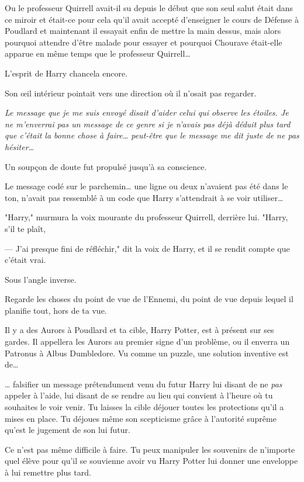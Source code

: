 Ou le professeur Quirrell avait-il su depuis le début que son seul salut était dans ce miroir et était-ce pour cela qu'il avait accepté d'enseigner le cours de Défense à Poudlard et maintenant il essayait enfin de mettre la main dessus, mais alors pourquoi attendre d'être malade pour essayer et pourquoi Chourave était-elle apparue en même temps que le professeur Quirrell…

L'esprit de Harry chancela encore.

Son œil intérieur pointait vers une direction où il n'osait pas regarder.

\emph{Le message que je me suis envoyé disait d'aider celui qui observe les étoiles. Je ne m'enverrai pas un message de ce genre si je n'avais pas déjà déduit plus tard que c'était la bonne chose à faire… peut-être que le message me dit juste de ne pas hésiter…}

Un soupçon de doute fut propulsé jusqu'à sa conscience.

Le message codé sur le parchemin… une ligne ou deux n'avaient pas été dans le ton, n'avait pas ressemblé à un code que Harry s'attendrait à se voir utiliser…

"Harry," murmura la voix mourante du professeur Quirrell, derrière lui. "Harry, s'il te plaît,

--- J'ai presque fini de réfléchir," dit la voix de Harry, et il se rendit compte que c'était vrai.

Sous l'angle inverse.

Regarde les choses du point de vue de l'Ennemi, du point de vue depuis lequel il planifie tout, hors de ta vue.

Il y a des Aurors à Poudlard et ta cible, Harry Potter, est à présent sur ses gardes. Il appellera les Aurors au premier signe d'un problème, ou il enverra un Patronus à Albus Dumbledore. Vu comme un puzzle, une solution inventive est de…

… falsifier un message prétendument venu du futur Harry lui disant de ne \emph{pas} appeler à l'aide, lui disant de se rendre au lieu qui convient à l'heure où tu souhaites le voir venir. Tu laisses la cible déjouer toutes les protections qu'il a mises en place. Tu déjoues même son scepticisme grâce à l'autorité suprême qu'est le jugement de son lui futur.

Ce n'est pas même difficile à faire. Tu peux manipuler les souvenirs de n'importe quel élève pour qu'il se souvienne avoir vu Harry Potter lui donner une enveloppe à lui remettre plus tard.

